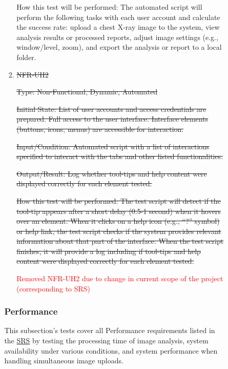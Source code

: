 \documentclass[12pt, titlepage]{article}
\begin{document}
\begin{enumerate}
\begin{enumerate}
\begin{enumerate}
\begin{enumerate}
How this test will be performed: The automated script will perform the following tasks with each user account and calculate the success rate: upload a chest X-ray image to the system, view analysis results or processed reports, adjust image settings (e.g., window/level, zoom), and export the analysis or report to a local folder.

\item{\sout{NFR-UH2}\\}\label{NFR-UH2}

\sout{Type: Non-Functional, Dynamic, Automated}

\sout{Initial State: List of user accounts and access credentials are prepared. Full access to the user interface. Interface elements (buttons, icons, menus) are accessible for interaction.}

\sout{Input/Condition: Automated script with a list of interactions specified to interact with the tabs and other listed functionalities.}

\sout{Output/Result: Log whether tool-tips and help content were displayed correctly for each element tested.}

\sout{How this test will be performed: The test script will detect if the tool-tip appears after a short delay (0.5-1 second) when it hovers over an element. When it clicks on a help icon (e.g., “?” symbol) or help link, the test script checks if the system provides relevant information about that part of the interface. When the test script finishes, it will provide a log including if tool-tips and help content were displayed correctly for each element tested.}


\textcolor{red}{Removed NFR-UH2 due to change in current scope of the project (corresponding to SRS)}

\end{enumerate}

\subsubsection{Performance}

This subsection's tests cover all Performance requirements listed in the \href{https://github.com/RezaJodeiri/CXR-Capstone/blob/main/docs/SRS/SRS.pdf}{SRS} \citep{SRS}
 by testing the processing time of image analysis, system availability under various conditions, and system performance when handling simultaneous image uploads.

\begin{enumerate}


\end{enumerate}
\end{enumerate}
\end{enumerate}
\end{enumerate}
\end{document}
